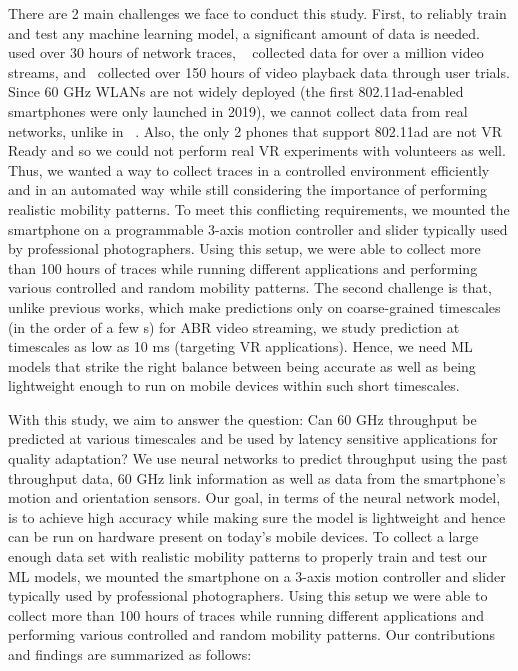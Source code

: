 \documentclass[sigconf,anonymous]{acmart}
\begin{document}
There are 2 main challenges we face to conduct this study. First, to reliably train and test any machine learning model, a significant amount of data is needed.~\cite{mao:sigcomm2017} used over 30 hours of network traces, ~\cite{yan:nsdi2020} collected data for over a million video streams, and~\cite{xu:conext2017} collected over 150 hours of video playback data through user trials. Since 60 GHz WLANs are not widely deployed (the first 802.11ad-enabled smartphones were only launched in 2019), we cannot collect data from real networks, unlike in ~\cite{mao:sigcomm2017,yan:nsdi2020}. Also, the only 2 phones that support 802.11ad are not VR Ready and so we could not perform real VR experiments with volunteers as well. Thus, we wanted a way to collect traces in a controlled environment efficiently and in an automated way while still considering the importance of performing realistic mobility patterns. To meet this conflicting requirements, we mounted the smartphone on a programmable 3-axis motion controller and slider typically used by professional photographers. Using this setup, we were able to collect more than 100 hours of traces while running different applications and performing various controlled and random mobility patterns. The second challenge is that, unlike previous works, which make predictions only on coarse-grained timescales (in the order of a few s) for ABR video streaming, we study prediction at timescales as low as 10 ms (targeting VR applications). Hence, we need ML models that strike the right balance between being accurate as well as being lightweight enough to run on mobile devices within such short timescales.

With this study, we aim to answer the question: Can 60 GHz throughput be predicted at various timescales and be used by latency sensitive applications for quality adaptation? We use neural networks to predict throughput using the past throughput data, 60 GHz link information as well as data from the smartphone's motion and orientation sensors. Our goal, in terms of the neural network model, is to achieve high accuracy while making sure the model is lightweight and hence can be run on hardware present on today's mobile devices. To collect a large enough data set with realistic mobility patterns to properly train and test our ML models, we mounted the smartphone on a 3-axis motion controller and slider typically used by professional photographers. Using this setup we were able to collect more than 100 hours of traces while running different applications and performing various controlled and random mobility patterns. 
\fi
Our contributions and findings are summarized as follows:
\end{document}
